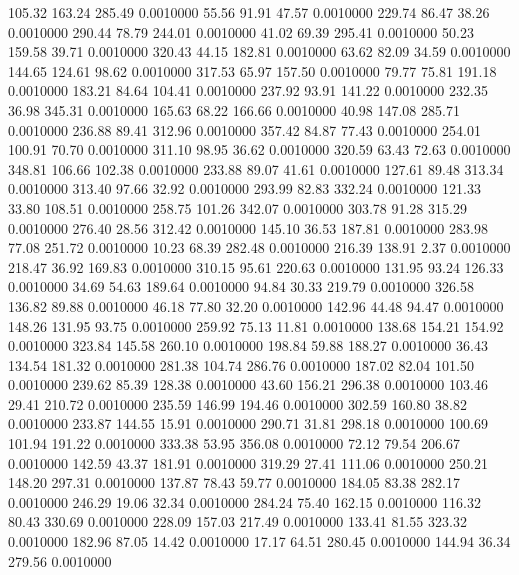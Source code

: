  105.32  163.24  285.49   0.0010000
  55.56   91.91   47.57   0.0010000
 229.74   86.47   38.26   0.0010000
 290.44   78.79  244.01   0.0010000
  41.02   69.39  295.41   0.0010000
  50.23  159.58   39.71   0.0010000
 320.43   44.15  182.81   0.0010000
  63.62   82.09   34.59   0.0010000
 144.65  124.61   98.62   0.0010000
 317.53   65.97  157.50   0.0010000
  79.77   75.81  191.18   0.0010000
 183.21   84.64  104.41   0.0010000
 237.92   93.91  141.22   0.0010000
 232.35   36.98  345.31   0.0010000
 165.63   68.22  166.66   0.0010000
  40.98  147.08  285.71   0.0010000
 236.88   89.41  312.96   0.0010000
 357.42   84.87   77.43   0.0010000
 254.01  100.91   70.70   0.0010000
 311.10   98.95   36.62   0.0010000
 320.59   63.43   72.63   0.0010000
 348.81  106.66  102.38   0.0010000
 233.88   89.07   41.61   0.0010000
 127.61   89.48  313.34   0.0010000
 313.40   97.66   32.92   0.0010000
 293.99   82.83  332.24   0.0010000
 121.33   33.80  108.51   0.0010000
 258.75  101.26  342.07   0.0010000
 303.78   91.28  315.29   0.0010000
 276.40   28.56  312.42   0.0010000
 145.10   36.53  187.81   0.0010000
 283.98   77.08  251.72   0.0010000
  10.23   68.39  282.48   0.0010000
 216.39  138.91    2.37   0.0010000
 218.47   36.92  169.83   0.0010000
 310.15   95.61  220.63   0.0010000
 131.95   93.24  126.33   0.0010000
  34.69   54.63  189.64   0.0010000
  94.84   30.33  219.79   0.0010000
 326.58  136.82   89.88   0.0010000
  46.18   77.80   32.20   0.0010000
 142.96   44.48   94.47   0.0010000
 148.26  131.95   93.75   0.0010000
 259.92   75.13   11.81   0.0010000
 138.68  154.21  154.92   0.0010000
 323.84  145.58  260.10   0.0010000
 198.84   59.88  188.27   0.0010000
  36.43  134.54  181.32   0.0010000
 281.38  104.74  286.76   0.0010000
 187.02   82.04  101.50   0.0010000
 239.62   85.39  128.38   0.0010000
  43.60  156.21  296.38   0.0010000
 103.46   29.41  210.72   0.0010000
 235.59  146.99  194.46   0.0010000
 302.59  160.80   38.82   0.0010000
 233.87  144.55   15.91   0.0010000
 290.71   31.81  298.18   0.0010000
 100.69  101.94  191.22   0.0010000
 333.38   53.95  356.08   0.0010000
  72.12   79.54  206.67   0.0010000
 142.59   43.37  181.91   0.0010000
 319.29   27.41  111.06   0.0010000
 250.21  148.20  297.31   0.0010000
 137.87   78.43   59.77   0.0010000
 184.05   83.38  282.17   0.0010000
 246.29   19.06   32.34   0.0010000
 284.24   75.40  162.15   0.0010000
 116.32   80.43  330.69   0.0010000
 228.09  157.03  217.49   0.0010000
 133.41   81.55  323.32   0.0010000
 182.96   87.05   14.42   0.0010000
  17.17   64.51  280.45   0.0010000
 144.94   36.34  279.56   0.0010000
